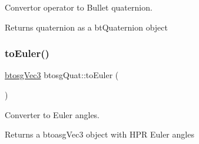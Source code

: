 Convertor operator to Bullet quaternion. 

Returns quaternion as a bt\+Quaternion object \mbox{\label{classbtosgQuat_aeda394d825b449ab87a77820aad1737d}} 
\subsubsection{\texorpdfstring{to\+Euler()}{toEuler()}}
{\footnotesize\ttfamily \hyperlink{classbtosgVec3}{btosg\+Vec3} btosg\+Quat\+::to\+Euler (\begin{DoxyParamCaption}{ }\end{DoxyParamCaption})}



Converter to Euler angles. 

Returns a btoasg\+Vec3 object with H\+PR Euler angles 

